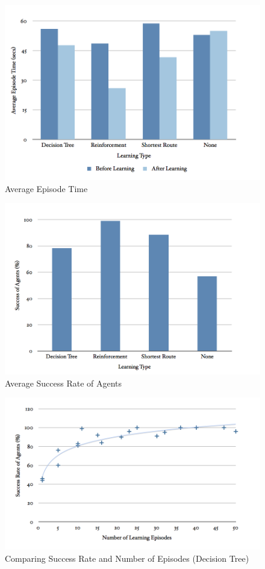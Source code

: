 \documentclass[a4paper,oneside]{report}
\begin{document}
\begin{figure}[H]
  \centering
    \includegraphics[width=140mm]{sources/images/AvgEpisode}
    \caption{Average Episode Time}
    \label{fig:AvgTime}
\end{figure}

\begin{figure}[H]
  \centering
    \includegraphics[width=140mm]{sources/images/AvgSuccess}
    \caption{Average Success Rate of Agents}
    \label{fig:AvgSuccess}
\end{figure}

\begin{figure}[H]
  \centering
    \includegraphics[width=140mm]{sources/images/SE_Tree}
    \caption{Comparing Success Rate and Number of Episodes (Decision Tree)}
    \label{fig:SE_Tree}
\end{figure}
\end{document}
